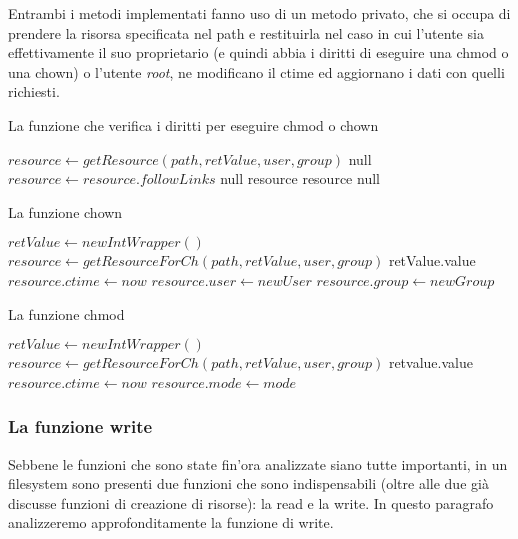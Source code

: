 Entrambi i metodi implementati fanno uso di un metodo privato, che si occupa di prendere la risorsa specificata nel path e restituirla nel caso in cui l'utente sia effettivamente il suo proprietario (e quindi abbia i diritti di eseguire una chmod o una chown) o l'utente \emph{root}, ne modificano il ctime ed aggiornano i dati con quelli richiesti.
\begin{algorithm}
\begin{algorithmic}[5]
\caption{La funzione che verifica i diritti per eseguire chmod o chown}
	\State $resource \gets getResource(path, retValue, user, group)$
		\State \Return null
	\EndIf
		\State $resource \gets resource.followLinks$
			\State \Return null
		\EndIf
	\EndIf
		\State \Return resource
	\EndIf
		\State \Return resource
	\EndIf
	\State \Return null 
\EndFunction
\end{algorithmic}
\end{algorithm}
\begin{algorithm}
\begin{algorithmic}[5]
\caption{La funzione chown}
	\State $retValue \gets new IntWrapper()$
	\State $resource \gets getResourceForCh(path, retValue, user, group)$
		\State \Return retValue.value
	\EndIf
	\State $resource.ctime \gets now$
	\State $resource.user \gets newUser$	
	\State $resource.group \gets newGroup$
	\State {}
\EndFunction
\end{algorithmic}
\end{algorithm}
\begin{algorithm}
\begin{algorithmic}[5]
\caption{La funzione chmod}
	\State $retValue \gets new IntWrapper()$
	\State $resource \gets getResourceForCh(path, retValue, user, group)$
		\State \Return retvalue.value
	\EndIf
	\State $resource.ctime \gets now$
	\State $resource.mode \gets mode$
	\State {}
\EndFunction
\end{algorithmic}
\end{algorithm}

\subsubsection{La funzione write}
Sebbene le funzioni che sono state fin'ora analizzate siano tutte importanti, in un filesystem sono presenti due funzioni che sono indispensabili (oltre alle due già discusse funzioni di creazione di risorse): la read e la write. In questo paragrafo analizzeremo approfonditamente la funzione di write.


